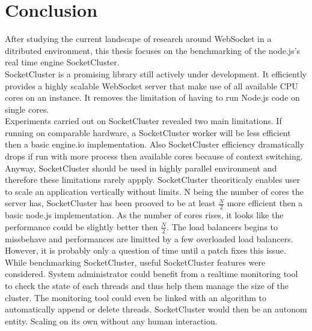 \chapter{Conclusion} 
\label{Chapter5} 

After studying the current landscape of research around WebSocket 
in a ditributed environment, this thesis focuses on the benchmarking 
of the node.js's real time engine SocketCluster.\\

SocketCluster is a promising library still actively under development.
It efficiently provides a highly scalable WebSocket server that make
use of all available CPU cores on an instance. It removes the limitation
of having to run Node.js code on single cores.\\

Experiments carried out on SocketCluster revealed two main limitations.  If
running on comparable hardware, a SocketCluster worker will be less efficient
then a basic engine.io implementation. Also SocketCluster efficiency
dramatically drops if run with more process then available cores because of
context switching.\\

Anyway, SocketCluster should be used in highly parallel environment and
therefore these limitations rarely appply. SocketCluster theoriticaly  enables
user to scale an application vertically  without limits. N being the number of
cores the server has, SocketCluster has been prooved to be at least
$\frac{N}{2}$ more efficient then a basic node.js implementation.  As the
number of cores rises, it looks like the performance could be slightly better
then $\frac{N}{2}$. The load balancers begins to missbehave and performances
are limitted by a few overloaded load balancers. However, it is probably only a
question of time until a patch fixes this issue.\\

While benchmarking SocketCluster, useful SocketCluster features were
considered.  System administrator could benefit from a realtime monitoring tool
to check the state of each threads and thus help them manage the size of the
cluster. The monitoring tool could even be linked with an algorithm to
automatically append or delete threads.  SocketCluster would then be an autonom
entity. Scaling on its own without any human interaction.\\



